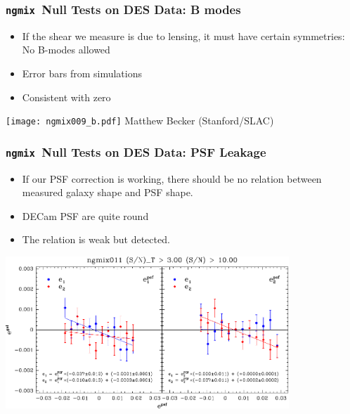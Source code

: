 \documentclass{beamer}
\newcommand{\ngmix}{\texttt{ngmix}}
\begin{document}
\frame
{
    \frametitle{\ngmix\ Null Tests on DES Data: B modes}

    \begin{itemize}

        \item If the shear we measure is due to lensing, it must have
            certain symmetries: No B-modes allowed

        \item Error bars from simulations
        
        \item Consistent with zero

    \end{itemize}

    \begin{center}
        \texttt{[image: ngmix009\_b.pdf]}
        \newline
        Matthew Becker (Stanford/SLAC)
    \end{center}

}


\frame
{
    \frametitle{\ngmix\ Null Tests on DES Data: PSF Leakage}

    \begin{itemize}

        \item If our PSF correction is working, there should be no relation between
            measured galaxy shape and PSF shape.

        \item DECam PSF are quite round 

        \item The relation is weak but detected.

    \end{itemize}


    \begin{center}
        \includegraphics[width=0.8\textwidth]{ngmix011-e-vs-epsf-Ts2n-min-300-s2n-min-10.pdf}
    \end{center}

}
\end{document}

